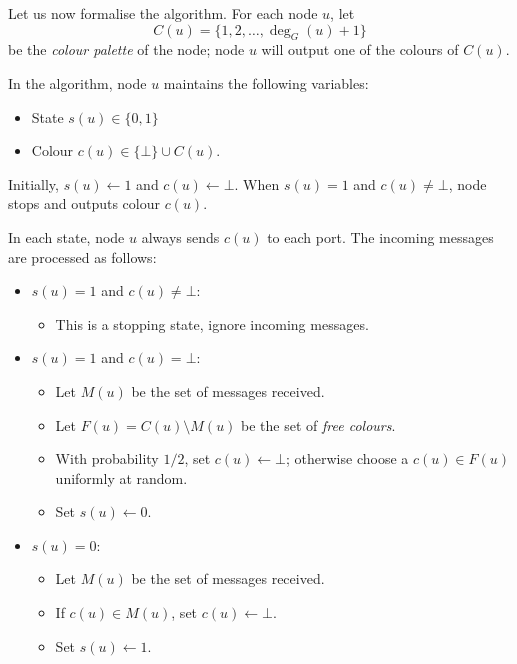 Let us now formalise the algorithm. For each node $u$, let
\[
    C(u) = \{1,2,\dotsc,\deg_G(u)+1\}
\]
be the \emph{colour palette} of the node; node $u$ will output one of the colours of $C(u)$. 

In the algorithm, node $u$ maintains the following variables:
\begin{itemize}[noitemsep]
    \item State $s(u) \in \{0,1\}$
    \item Colour $c(u) \in \{\bot\} \cup C(u)$.
\end{itemize}
Initially, $s(u) \gets 1$ and $c(u) \gets \bot$. When $s(u) = 1$ and $c(u) \ne \bot$, node stops and outputs colour $c(u)$.

In each state, node $u$ always sends $c(u)$ to each port. The incoming messages are processed as follows:
\begin{itemize}
    \item $s(u) = 1$ and $c(u) \ne \bot$:
    \begin{itemize}
        \item This is a stopping state, ignore incoming messages.
    \end{itemize}
    \item $s(u) = 1$ and $c(u) = \bot$:
    \begin{itemize}
        \item Let $M(u)$ be the set of messages received.
        \item Let $F(u) = C(u) \setminus M(u)$ be the set of \emph{free colours}.
        \item With probability $1/2$, set $c(u) \gets \bot$; otherwise choose a $c(u) \in F(u)$ uniformly at random.
        \item Set $s(u) \gets 0$.
    \end{itemize}
    \item $s(u) = 0$:
    \begin{itemize}
        \item Let $M(u)$ be the set of messages received.
        \item If $c(u) \in M(u)$, set $c(u) \gets \bot$.
        \item Set $s(u) \gets 1$.
    \end{itemize}
\end{itemize}

